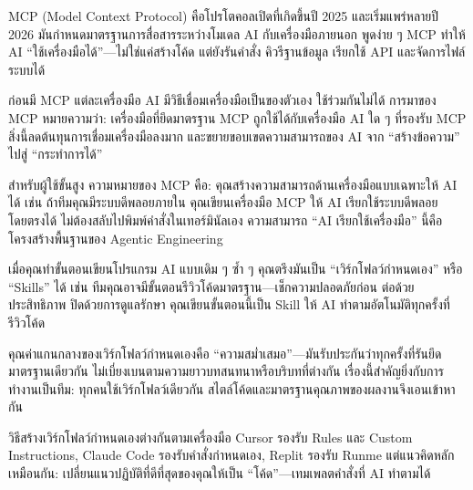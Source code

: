 


MCP (Model Context Protocol) คือโปรโตคอลเปิดที่เกิดขึ้นปี 2025 และเริ่มแพร่หลายปี 2026 มันกำหนดมาตรฐานการสื่อสารระหว่างโมเดล AI กับเครื่องมือภายนอก พูดง่าย ๆ MCP ทำให้ AI “ใช้เครื่องมือได้”—ไม่ใช่แค่สร้างโค้ด แต่ยังรันคำสั่ง คิวรีฐานข้อมูล เรียกใช้ API และจัดการไฟล์ระบบได้

ก่อนมี MCP แต่ละเครื่องมือ AI มีวิธีเชื่อมเครื่องมือเป็นของตัวเอง ใช้ร่วมกันไม่ได้ การมาของ MCP หมายความว่า: เครื่องมือที่ยึดมาตรฐาน MCP ถูกใช้ได้กับเครื่องมือ AI ใด ๆ ที่รองรับ MCP สิ่งนี้ลดต้นทุนการเชื่อมเครื่องมือลงมาก และขยายขอบเขตความสามารถของ AI จาก “สร้างข้อความ” ไปสู่ “กระทำการได้”

สำหรับผู้ใช้ขั้นสูง ความหมายของ MCP คือ: คุณสร้างความสามารถด้านเครื่องมือแบบเฉพาะให้ AI ได้ เช่น ถ้าทีมคุณมีระบบดีพลอยภายใน คุณเขียนเครื่องมือ MCP ให้ AI เรียกใช้ระบบดีพลอยโดยตรงได้ ไม่ต้องสลับไปพิมพ์คำสั่งในเทอร์มินัลเอง ความสามารถ “AI เรียกใช้เครื่องมือ” นี้คือโครงสร้างพื้นฐานของ Agentic Engineering


เมื่อคุณทำขั้นตอนเขียนโปรแกรม AI แบบเดิม ๆ ซ้ำ ๆ คุณตรึงมันเป็น “เวิร์กโฟลว์กำหนดเอง” หรือ “Skills” ได้ เช่น ทีมคุณอาจมีขั้นตอนรีวิวโค้ดมาตรฐาน—เช็กความปลอดภัยก่อน ต่อด้วยประสิทธิภาพ ปิดด้วยการดูแลรักษา คุณเขียนขั้นตอนนี้เป็น Skill ให้ AI ทำตามอัตโนมัติทุกครั้งที่รีวิวโค้ด

คุณค่าแกนกลางของเวิร์กโฟลว์กำหนดเองคือ “ความสม่ำเสมอ”—มันรับประกันว่าทุกครั้งที่รันยึดมาตรฐานเดียวกัน ไม่เบี่ยงเบนตามความยาวบทสนทนาหรือบริบทที่ต่างกัน เรื่องนี้สำคัญยิ่งกับการทำงานเป็นทีม: ทุกคนใช้เวิร์กโฟลว์เดียวกัน สไตล์โค้ดและมาตรฐานคุณภาพของผลงานจึงเอนเข้าหากัน

วิธีสร้างเวิร์กโฟลว์กำหนดเองต่างกันตามเครื่องมือ Cursor รองรับ Rules และ Custom Instructions, Claude Code รองรับคำสั่งกำหนดเอง, Replit รองรับ Runme แต่แนวคิดหลักเหมือนกัน: เปลี่ยนแนวปฏิบัติที่ดีที่สุดของคุณให้เป็น “โค้ด”—เทมเพลตคำสั่งที่ AI ทำตามได้


